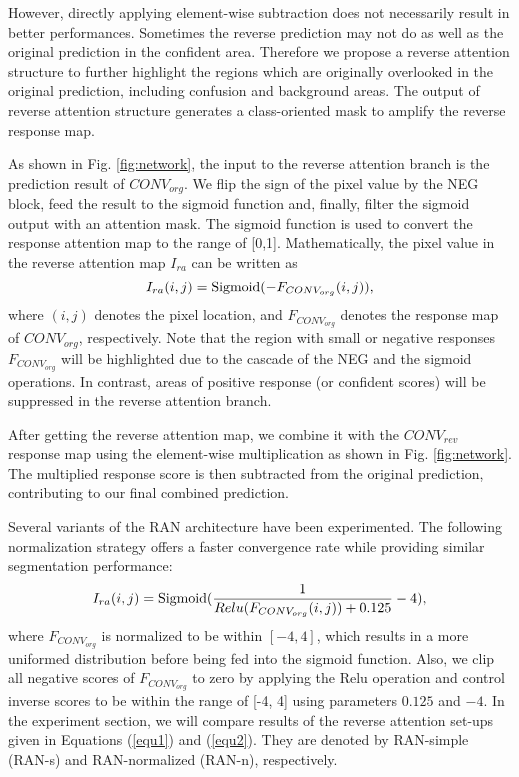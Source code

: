 \documentclass[runningheads]{llncs}
\begin{document}
However, directly applying element-wise subtraction does not necessarily result in better performances.
Sometimes the reverse prediction may not do as well as the original prediction in the confident area.
Therefore we propose a reverse attention structure to further highlight the regions which are originally
overlooked in the original prediction, including confusion and background areas. The output of reverse attention structure generates a 
class-oriented mask to amplify the reverse response map. 

As shown in Fig. \ref{fig:network}, the input to the reverse attention branch is the
prediction result of $CONV_{org}$. We flip the sign of the pixel value by
the NEG block, feed the result to the sigmoid function and, finally,
filter the sigmoid output with an attention mask. The sigmoid function
is used to convert the response attention map to the range of [0,1].
Mathematically, the pixel value in the reverse attention map $I_{ra}$ can be
written as
\begin{equation}\label{equ1}
I_{ra}(i,j)= {\rm Sigmoid} (-F_{CONV_{org}}(i,j)),
\end{equation}
where $(i, j)$ denotes the pixel location, and $F_{CONV_{org}}$ 
denotes the response map of $CONV_{org}$, respectively. Note that the region with small or negative responses
$F_{CONV_{org}}$ will be highlighted due to the cascade of the NEG and
the sigmoid operations. In contrast, areas of positive response (or
confident scores) will be suppressed in the reverse attention branch.



After getting the reverse attention map, we combine it with the
$CONV_{rev}$ response map using the element-wise multiplication as shown in
Fig. \ref{fig:network}. The multiplied response score is then subtracted from the original prediction, contributing to our final combined prediction.

Several variants of the RAN architecture have been experimented. The
following normalization strategy offers a faster convergence rate while
providing similar segmentation performance:
\begin{equation}\label{equ2}
I_{ra}(i,j)= {\rm Sigmoid}
(\frac{1}{Relu(F_{CONV_{org}}(i,j))+0.125}-4),
\end{equation}
where $F_{CONV_{org}}$ is normalized to be within $[-4,4]$, which
results in a more uniformed distribution before being fed into the
sigmoid function. Also, we clip all negative scores of $F_{CONV_{org}}$
to zero by applying the Relu operation and control inverse scores to be
within the range of [-4, 4] using parameters $0.125$ and $-4$.  In the
experiment section, we will compare results of the reverse attention
set-ups given in Equations (\ref{equ1}) and (\ref{equ2}). They are 
denoted by RAN-simple (RAN-s) and RAN-normalized (RAN-n), respectively.
\end{document}
